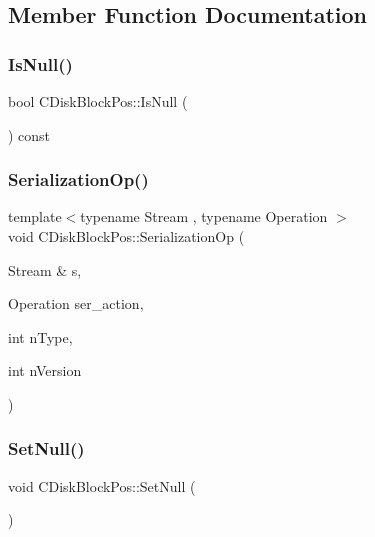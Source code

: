 \subsection{Member Function Documentation}
\mbox{\label{struct_c_disk_block_pos_a7dd98fe3f5372d358df61db31899b0af}} 
\subsubsection{\texorpdfstring{Is\+Null()}{IsNull()}}
{\footnotesize\ttfamily bool C\+Disk\+Block\+Pos\+::\+Is\+Null (\begin{DoxyParamCaption}{ }\end{DoxyParamCaption}) const\hspace{0.3cm}{\ttfamily [inline]}}

\mbox{\label{struct_c_disk_block_pos_a821bb4eebc99ae39c20133d80244325f}} 
\subsubsection{\texorpdfstring{Serialization\+Op()}{SerializationOp()}}
{\footnotesize\ttfamily template$<$typename Stream , typename Operation $>$ \\
void C\+Disk\+Block\+Pos\+::\+Serialization\+Op (\begin{DoxyParamCaption}\item[{Stream \&}]{s,  }\item[{Operation}]{ser\+\_\+action,  }\item[{int}]{n\+Type,  }\item[{int}]{n\+Version }\end{DoxyParamCaption})\hspace{0.3cm}{\ttfamily [inline]}}

\mbox{\label{struct_c_disk_block_pos_a0a6ba113219a456472081ee6d6b20a72}} 
\subsubsection{\texorpdfstring{Set\+Null()}{SetNull()}}
{\footnotesize\ttfamily void C\+Disk\+Block\+Pos\+::\+Set\+Null (\begin{DoxyParamCaption}{ }\end{DoxyParamCaption})\hspace{0.3cm}{\ttfamily [inline]}}

